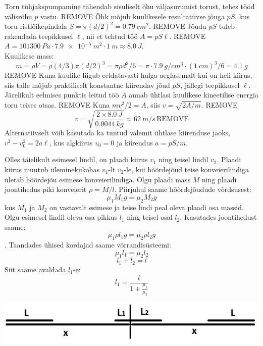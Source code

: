 \documentclass[10pt]{article}
\newcommand{\pp}[1]{REMOVE}
\begin{document}
\solu
\osa Toru tühjakspumpamine tähendab sisuliselt õhu väljasurumist torust, tehes tööd välisrõhu $p$ vastu. \pp{1} Õhk mõjub kuulikesele resultatiivse jõuga $pS$, kus toru ristlõikepindala $S=\pi(d/2)^2=\SI{0.79}{cm^2}$. \pp{1} Jõudu $pS$ tuleb rakendada teepikkusel $\ell$, nii et tehtud töö $A=pS\ell$. \pp{1}   $A=\SI{101300}{Pa}\cdot \SI{7.9e-5}{m^2}\cdot\SI{1}{m}\approx\SI{8.0}{J}$. \\
\osa Kuulikese mass: \[m=\rho V=\rho(4/3)\pi(d/2)^3=\pi \rho d^3/6= \pi\cdot \SI{7.9}{g/cm^3}\cdot (\SI{1}{cm})^3/6 =\SI{4.1}{g}\] \pp{1} Kuna kuulike liigub eeldatavasti hulga aeglasemalt kui on heli kiirus, siis talle mõjub praktiliselt konstantne kiirendav jõud $pS$, jällegi teepikkusel $\ell$. Järelikult eelmises punktis leitud töö $A$ annab ühtlasi kuulikese kineetilise energia toru teises otsas. \pp{1} Kuna $mv^2/2=A$, siis $v=\sqrt{2A/m}$. \pp{1}
\[
v=\sqrt{\frac{2\times \SI{8.0}{J}}{\SI{0.0041}{kg}}}\approx\SI{62}{m/s}\,\text{\pp{1}}
\]
Alternatiivselt võib kasutada ka tuntud valemit ühtlase kiirenduse jaoks, $v^2-v_0^2=2a\ell$, kus algkiirus $v_0=0$ ja kiirendus $a=pS/m$.
\probend
\bigskip

\setAuthor{}

\solu
Olles täielikult esimesel lindil, on plaadi kiirus $v_1$ ning teisel lindil $v_2$. Plaadi kiirus muutub üleminekukohas $v_1$-lt $v_2$-le, kui hõõrdejõud teise konveierilindiga ületab hõõrdejõu esimese konveierilindiga. Olgu plaadi mass $M$ ning plaadi joontihedus piki konveierit $\rho = M/l$. Piirjuhul saame hõõrdejõudude võrdsusest:
$$\mu_{1}M_1g = \mu_{2}M_2g$$
kus $M_1$ ja $M_2$ on vastavalt esimese ja teise lindi peal oleva plaadi osa massid. Olgu esimesel lindil oleva osa pikkus $l_1$ ning teisel osal $l_2$. Kasutades joontihedust saame:
$$\mu_{1} \rho l_1 g = \mu_{2}\rho l_2 g$$.
Taandades ühised kordajad saame võrrandisüsteemi:
$$\mu_{1} l_1 = \mu_{2} l_2$$
$$l_1 + l_2 = l$$
Siit saame avaldada $l_1$-e:
$$l_1 = \frac{l}{1+\frac{\mu_{1}}{\mu_{2}}}$$

\begin{center}
\includegraphics[scale=0.5]{2019-v3g-04-yl.png}
\end{center}
\end{document}
